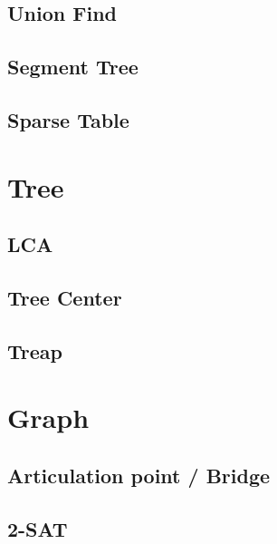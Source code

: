 \documentclass[10pt,oneside]{article}
\begin{document}
\begin{landscape}
\begin{multicols}{2}

\subsection{Union Find}


\subsection{Segment Tree}

\subsection{Sparse Table}


\section{Tree}

\subsection{LCA}

\subsection{Tree Center}

\subsection{Treap}


\section{Graph}

\subsection{Articulation point / Bridge}

\subsection{2-SAT}


\end{multicols}
\end{landscape}
\end{document}
